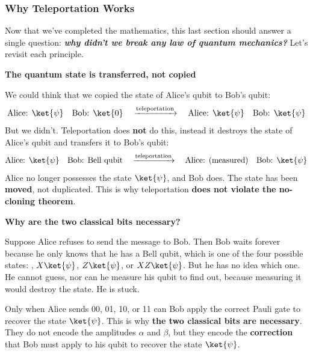 \subsubsection{Why Teleportation Works}\label{sec:why-teleportation-works}

Now that we've completed the mathematics, this last section should answer a single question: \textbf{\emph{why didn't we break any law of quantum mechanics?}} Let's revisit each principle.

\highspace
\begin{flushleft}
    \textcolor{Green3}{ \textbf{The quantum state is transferred, not copied}}
\end{flushleft}
We could think that we copied the state of Alice's qubit to Bob's qubit:
\begin{equation*}
    \text{Alice: } \ket{\psi} \quad \text{Bob: } \ket{0} \quad \xrightarrow{\text{teleportation}} \quad \text{Alice: } \ket{\psi} \quad \text{Bob: } \ket{\psi}
\end{equation*}
But we didn't. Teleportation does \textbf{not} do this, instead it destroys the state of Alice's qubit and transfers it to Bob's qubit:
\begin{equation*}
    \text{Alice: } \ket{\psi} \quad \text{Bob: Bell qubit} \quad \xrightarrow{\text{teleportation}} \quad \text{Alice: (measured)} \quad \text{Bob: } \ket{\psi}
\end{equation*}
Alice no longer possesses the state $\ket{\psi}$, and Bob does. The state has been \textbf{moved}, not duplicated. This is why teleportation \textbf{does not violate the no-cloning theorem}.

\highspace
\begin{flushleft}
    \textcolor{Green3}{ \textbf{Why are the two classical bits necessary?}}
\end{flushleft}
Suppose Alice refuses to send the message to Bob. Then Bob waits forever because he only knows that he has a Bell qubit, which is one of the four possible states: \ket{\psi}, $X\ket{\psi}$, $Z\ket{\psi}$, or $XZ\ket{\psi}$. But he has no idea which one. He cannot guess, nor can he measure his qubit to find out, because measuring it would destroy the state. He is stuck.

\highspace
Only when Alice sends 00, 01, 10, or 11 can Bob apply the correct Pauli gate to recover the state $\ket{\psi}$. This is why \textbf{the two classical bits are necessary}. They do not encode the amplitudes $\alpha$ and $\beta$, but they encode the \textbf{correction} that Bob must apply to his qubit to recover the state $\ket{\psi}$.

